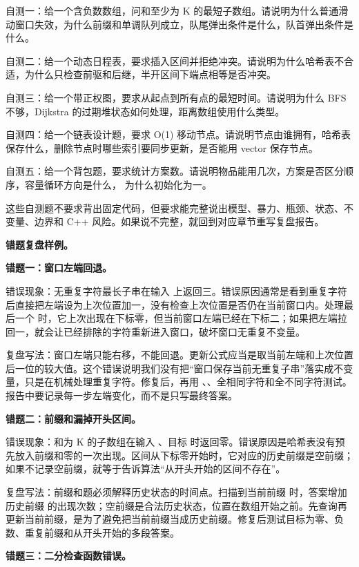 自测一：给一个含负数数组，问和至少为 K 的最短子数组。请说明为什么普通滑动窗口失效，为什么前缀和单调队列成立，队尾弹出条件是什么，队首弹出条件是什么。

自测二：给一个动态日程表，要求插入区间并拒绝冲突。请说明为什么哈希表不合适，为什么只检查前驱和后继，半开区间下端点相等是否冲突。

自测三：给一个带正权图，要求从起点到所有点的最短时间。请说明为什么 BFS 不够，Dijkstra 的过期堆状态如何处理，距离数组使用什么类型。

自测四：给一个链表设计题，要求 O(1) 移动节点。请说明节点由谁拥有，哈希表保存什么，删除节点时哪些索引要同步更新，是否能用 vector 保存节点。

自测五：给一个背包题，要求统计方案数。请说明物品能用几次，方案是否区分顺序，容量循环方向是什么， 为什么初始化为一。

这些自测题不要求背出固定代码，但要求能完整说出模型、暴力、瓶颈、状态、不变量、边界和 C++ 风险。如果说不完整，就回到对应章节重写复盘报告。

\noindent\textbf{错题复盘样例。}

\noindent\textbf{错题一：窗口左端回退。}

错误现象：无重复字符最长子串在输入  上返回三。错误原因通常是看到重复字符后直接把左端设为上次位置加一，没有检查上次位置是否仍在当前窗口内。处理最后一个  时，它上次出现在下标零，但当前窗口左端已经在下标二；如果把左端拉回一，就会让已经排除的字符重新进入窗口，破坏窗口无重复不变量。

复盘写法：窗口左端只能右移，不能回退。更新公式应当是取当前左端和上次位置后一位的较大值。这个错误说明我们没有把“窗口保存当前无重复子串”落实成不变量，只是在机械处理重复字符。修复后，再用 、、全相同字符和全不同字符测试。报告中要记录每一步左端变化，而不是只写最终答案。

\noindent\textbf{错题二：前缀和漏掉开头区间。}

错误现象：和为 K 的子数组在输入 \code{[3]}、目标  时返回零。错误原因是哈希表没有预先放入前缀和零的一次出现。区间从下标零开始时，它对应的历史前缀是空前缀；如果不记录空前缀，就等于告诉算法“从开头开始的区间不存在”。

复盘写法：前缀和题必须解释历史状态的时间点。扫描到当前前缀  时，答案增加历史前缀  的出现次数；空前缀是合法历史状态，位置在数组开始之前。先查询再更新当前前缀，是为了避免把当前前缀当成历史前缀。修复后测试目标为零、负数、重复前缀和从开头开始的多段答案。

\noindent\textbf{错题三：二分检查函数错误。}

